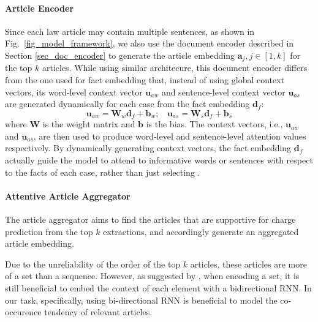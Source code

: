 \paragraph{Article Encoder}
\label{sec_article_encoder}
Since each law article may contain multiple sentences, as shown in Fig.~\ref{fig_model_framework}, we also use the document encoder described in Section \ref{sec_doc_encoder} to generate the article embedding $\mathbf{a}_j, j\in [1, k]$ for the top $k$ articles. 
While using similar architecure, this document encoder differs from the one used for fact embedding that, instead of using global context vectors, its word-level context vector $\mathbf{u}_{aw}$ and sentence-level context vector $\mathbf{u}_{as}$ are generated dynamically for each case from the fact embedding $\mathbf{d}_f$:
\begin{equation}
\mathbf{u}_{aw} = \mathbf{W}_w \mathbf{d}_f + \mathbf{b}_w;\ \ \ \ \mathbf{u}_{as} = \mathbf{W}_s \mathbf{d}_f + \mathbf{b}_s
\label{eq_dynamic_context_vec}
\end{equation}
where $\mathbf{W}$ is the weight matrix and $\mathbf{b}$ is the bias. 
The context vectors, i.e., $\mathbf{u}_{aw}$ and $\mathbf{u}_{as}$, are then used to produce word-level and sentence-level attention values respectively.
By dynamically generating context vectors, the fact embedding $\mathbf{d}_f$ actually guide the model to attend to informative words or sentences with respect to the facts of each case, rather than just selecting .



\paragraph{Attentive Article Aggregator}
The article aggregator aims to find the articles that are supportive for charge prediction from the top $k$ extractions, and accordingly generate an aggregated article embedding.


Due to the unreliability of the order of the top $k$ articles, these articles are more of a set than a sequence.
However, as suggested by \cite{vinyals2016matching}, when encoding a set, it is still beneficial to embed the context of each element with a bidirectional RNN.
In our task, specifically, using bi-directional RNN is beneficial to model the co-occurence tendency of relevant articles.

